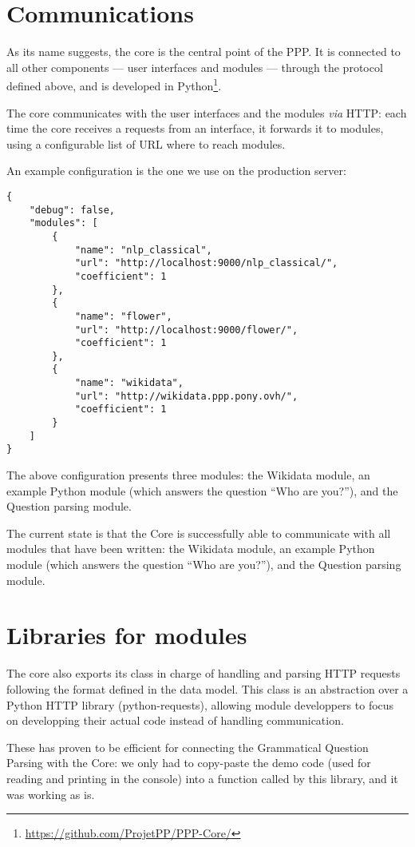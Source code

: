\section{Communications}

As its name suggests, the core is the central point of the PPP. It is
connected to all other components — user interfaces and modules — through
the protocol defined above, and is developed in Python\footnote{\url{https://github.com/ProjetPP/PPP-Core/}}.

The core communicates with the user interfaces and the modules {\em via} HTTP:
each time the core receives a requests from an interface, it forwards it
to modules, using a configurable list of URL where to reach modules.

An example configuration is the one we use on the production server:

\begin{verbatim}
{
    "debug": false,
    "modules": [
        {
            "name": "nlp_classical",
            "url": "http://localhost:9000/nlp_classical/",
            "coefficient": 1
        },
        {
            "name": "flower",
            "url": "http://localhost:9000/flower/",
            "coefficient": 1
        },
        {
            "name": "wikidata",
            "url": "http://wikidata.ppp.pony.ovh/",
            "coefficient": 1
        }
    ]
}
\end{verbatim}

The above configuration presents three modules: the Wikidata module, an example 
Python module (which answers the question  “Who are you?”), and the Question parsing module.

The current state is that the Core is successfully able to
communicate with all modules
that have been written: the Wikidata module, an example Python module
(which answers the question  “Who are you?”), and the Question parsing module.

\section{Libraries for modules}

The core also exports its class in charge of handling and parsing HTTP
requests following the format defined in the data model.
This class is an abstraction over a Python HTTP library (python-requests),
allowing module developpers to focus on developping their actual code
instead of handling communication.

These has proven to be efficient for connecting the Grammatical Question Parsing
with the Core: we only had to copy-paste the demo code
(used for reading and printing in the console) into a function called
by this library, and it was working as is.


